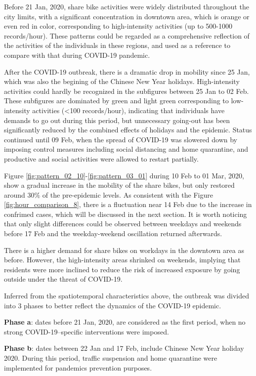 \documentclass[preprints,ijgi,submit,moreauthors]{Definitions/mdpi}
\begin{document}
Before 21 Jan, 2020, share bike activities were widely distributed throughout the city limits, with a significant concentration in downtown area, which is orange or even red in color, corresponding to high-intensity activities (up to 500-1000 records/hour).
These patterns could be regarded as a comprehensive reflection of the activities of the individuals in these regions, and used as a reference to compare with that during COVID-19 pandemic.

After the COVID-19 outbreak, there is a dramatic drop in mobility since 25 Jan, which was also the begining of the Chinese New Year holidays.
High-intensity activities could hardly be recognized in the subfigures between 25 Jan to 02 Feb. 
These subfigures are dominated by green and light green corresponding to low-intensity activities (<100 records/hour), indicating that individuals have demands to go out during this period, but unnecessary going-out has been significantly reduced by the combined effects of holidays and the epidemic.
Status continued until 09 Feb, when the spread of COVID-19 was slowered down by imposing control measures including social distancing and home quarantine, and productive and social activities were allowed to restart partially.

Figure \ref{fig:pattern_02_10}-\ref{fig:pattern_03_01} during 10 Feb to 01 Mar, 2020, show a gradual increase in the mobility of the share bikes, but only restored around $30\%$ of the pre-epidemic levels.
As consistent with the Figure \ref{fig:hour_comparison_8}, there is a fluctuation near 14 Feb due to the increase in confrimed cases, which will be discussed in the next section.
It is worth noticing that only slight differences could be observed between weekdays and weekends before 17 Feb and the weekday-weekend oscillation returned afterwards.

There is a higher demand for share bikes on workdays in the downtown area as before.
However, the high-intensity areas shrinked on weekends, implying that residents were more inclined to reduce the risk of increased exposure by going outside under the threat of COVID-19. 

Inferred from the spatiotemporal characteristics above, the outbreak was divided into 3 phases to better reflect the dynamics of the COVID-19 epidemic.

\textbf{Phase a}: dates before 21 Jan, 2020, are considered as the first period, when no strong COVID-19–specific interventions were imposed.

\textbf{Phase b}: dates between 22 Jan and 17 Feb, include Chinese New Year holiday 2020. During this period, traffic suspension and home quarantine were implemented for pandemics prevention purposes.
\end{document}

